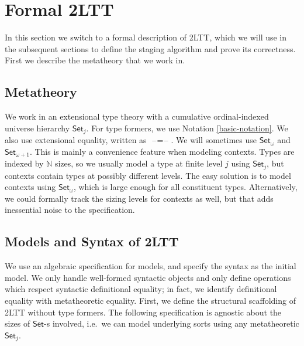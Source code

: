 \documentclass[acmsmall]{acmart}
\newcommand{\mbb}[1]{\mathbb{#1}}
\newcommand{\Set}{\mathsf{Set}}
\newcommand{\blank}{{\mathord{\hspace{1pt}\text{--}\hspace{1pt}}}}
\theoremstyle{remark}
\begin{document}
\section{Formal 2LTT}\label{sec:formal-2ltt}

In this section we switch to a formal description of 2LTT, which we will use in
the subsequent sections to define the staging algorithm and prove its
correctness. First we describe the metatheory that we work in.

\subsection{Metatheory} We work in an extensional type theory with
a cumulative ordinal-indexed universe hierarchy $\Set_j$. For type formers, we
use Notation \ref{basic-notation}. We also use extensional equality, written as
$\blank\!=\!\blank$. We will sometimes use $\Set_\omega$ and $\Set_{\omega+1}$.
This is mainly a convenience feature when modeling contexts. Types are indexed
by $\mbb{N}$ sizes, so we usually model a type at finite level $j$ using
$\Set_j$, but contexts contain types at possibly different levels. The easy
solution is to model contexts using $\Set_\omega$, which is large enough for all
constituent types. Alternatively, we could formally track the sizing levels for
contexts as well, but that adds inessential noise to the specification.

\subsection{Models and Syntax of 2LTT}
We use an algebraic specification for models, and specify the syntax as the
initial model. We only handle well-formed syntactic objects and only define
operations which respect syntactic definitional equality; in fact, we identify
definitional equality with metatheoretic equality. First, we define the
structural scaffolding of 2LTT without type formers. The following specification
is agnostic about the sizes of $\Set$-s involved, i.e.\ we can model underlying
sorts using any metatheoretic $\Set_j$.
\end{document}
